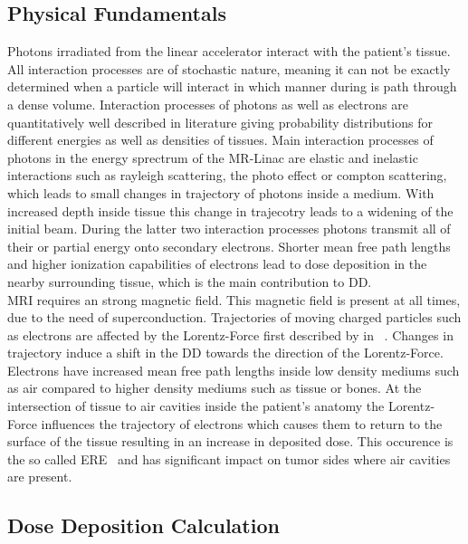 \subsection{Physical Fundamentals}

Photons irradiated from the linear accelerator interact with the patient's tissue.
All interaction processes are of stochastic nature, meaning it can not be exactly determined when a particle will interact in which manner during is path through a dense volume.
Interaction processes of photons as well as electrons are quantitatively well described in literature giving probability distributions for different energies as well as densities of tissues.
Main interaction processes of photons in the energy sprectrum of the MR-Linac are elastic and inelastic interactions such as rayleigh scattering, the photo effect or compton scattering, which leads to small changes in trajectory of photons inside a medium.
With increased depth inside tissue this change in trajecotry leads to a widening of the initial beam.
During the latter two interaction processes photons transmit all of their or partial energy onto secondary electrons.
Shorter mean free path lengths and higher ionization capabilities of electrons lead to dose deposition in the nearby surrounding tissue, which is the main contribution to \acs{DD}.\\
\ac{MRI} requires an strong magnetic field. 
This magnetic field is present at all times, due to the need of superconduction. 
Trajectories of moving charged particles such as electrons are affected by the Lorentz-Force first described by \citeauthor{lorentz_versuch_1937} in \citeyear{lorentz_versuch_1937}~\cite{lorentz_versuch_1937}.
Changes in trajectory induce a shift in the \acs{DD} towards the direction of the Lorentz-Force.
Electrons have increased mean free path lengths inside low density mediums such as air compared to higher density mediums such as tissue or bones.
At the intersection of tissue to air cavities inside the patient's anatomy the Lorentz-Force influences the trajectory of electrons which causes them to return to the surface of the tissue resulting in an increase in deposited dose.
This occurence is the so called \ac{ERE}~\cite{lee_using_2017} and has significant impact on tumor sides where air cavities are present.


\subsection{Dose Deposition Calculation}

